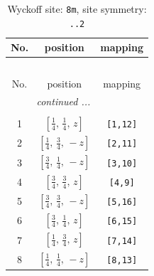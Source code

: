 \documentclass[fleqn,8pt]{jsarticle}
\begin{document}
\renewcommand{\arraystretch}{1.2}
\begin{longtable}{ccc}
\caption{Wyckoff site: {\tt 8m}, site symmetry: {\tt ..2}}
 \\
 \hline \hline
No. & position & mapping \\ \hline \endfirsthead

\multicolumn{2}{l}{\tablename\ \thetable{}} \\
 \hline \hline
No. & position & mapping \\ \hline \endhead

 \hline \hline
\multicolumn{2}{r}{\footnotesize\it continued ...} \\ \endfoot

 \hline \hline
\multicolumn{2}{r}{} \\ \endlastfoot

1 & $\left[ \frac{1}{4},\, \frac{1}{4},\, z \right]$ & {\tt [1,12]} \\ \hline
2 & $\left[ \frac{1}{4},\, \frac{3}{4},\, - z \right]$ & {\tt [2,11]} \\ \hline
3 & $\left[ \frac{3}{4},\, \frac{1}{4},\, - z \right]$ & {\tt [3,10]} \\ \hline
4 & $\left[ \frac{3}{4},\, \frac{3}{4},\, z \right]$ & {\tt [4,9]} \\ \hline
5 & $\left[ \frac{3}{4},\, \frac{3}{4},\, - z \right]$ & {\tt [5,16]} \\ \hline
6 & $\left[ \frac{3}{4},\, \frac{1}{4},\, z \right]$ & {\tt [6,15]} \\ \hline
7 & $\left[ \frac{1}{4},\, \frac{3}{4},\, z \right]$ & {\tt [7,14]} \\ \hline
8 & $\left[ \frac{1}{4},\, \frac{1}{4},\, - z \right]$ & {\tt [8,13]} \\
\end{longtable}
\renewcommand{\arraystretch}{1.2}
\end{document}
